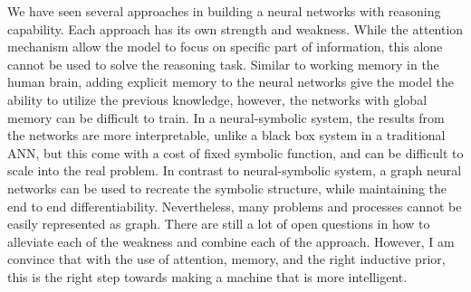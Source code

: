 \documentclass[journal]{IEEEtran}
\begin{document}
We have seen several approaches in building a neural networks with reasoning capability. 
Each approach has its own strength and weakness.
While the attention mechanism allow the model to focus on specific part of information, this alone cannot be used to solve the reasoning task.
Similar to working memory in the human brain, adding explicit memory to the neural networks give the model the ability to utilize the previous knowledge,
however, the networks with global memory can be difficult to train.
In a neural-symbolic system, the results from the networks are more interpretable, unlike a black box system in a traditional ANN,
but this come with a cost of fixed symbolic function, and can be difficult to scale into the real problem.
In contrast to neural-symbolic system, a graph neural networks can be used to recreate the symbolic structure, 
while maintaining the end to end differentiability. Nevertheless, many problems and processes cannot be easily represented as graph.
There are still a lot of open questions in how to alleviate each of the weakness and combine each of the approach. 
However, I am convince that with the use of attention, memory, and the right inductive prior, 
this is the right step towards making a machine that is more intelligent.



\end{document}

